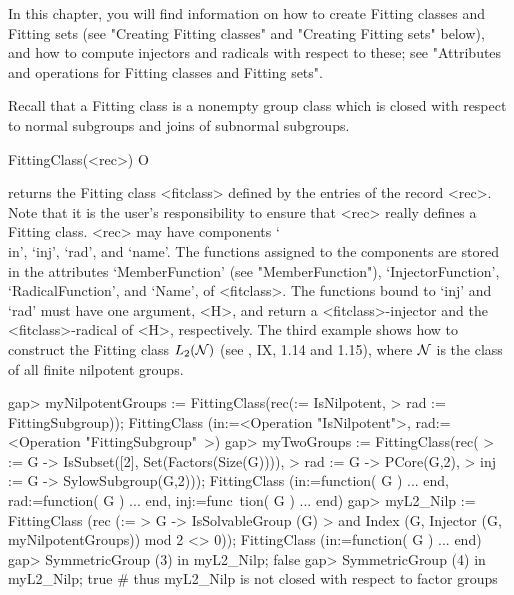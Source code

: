 
In this chapter, you will find information on how to create 
Fitting classes and Fitting sets (see "Creating Fitting classes" and
"Creating Fitting sets" below), and how to compute injectors and radicals
with respect to these;  see "Attributes and operations for Fitting classes
and Fitting sets".


\null


Recall that a Fitting class is a nonempty group class which is closed with respect
to normal subgroups and joins of subnormal subgroups.

\>FittingClass(<rec>) O

returns the Fitting class <fitclass> defined by the entries of the record
<rec>. Note that it is the user's responsibility to ensure that <rec> really
defines a Fitting class.
<rec> may have components `\\in', `inj', `rad', and `name'. The
functions assigned to the components are stored in the attributes
`MemberFunction' (see "MemberFunction"), `InjectorFunction',
`RadicalFunction', and `Name', of <fitclass>. The functions bound to `inj' and
`rad' must have one argument, <H>, and return a <fitclass>-injector and the
<fitclass>-radical of <H>, respectively. The third example shows how to construct
the Fitting class $L_2({\cal N})$ (see \cite{DH1992}, IX, 1.14 and 1.15), where
$\cal N$ is the class of all finite nilpotent groups.

\beginexample
gap> myNilpotentGroups := FittingClass(rec(\in := IsNilpotent,
>    rad := FittingSubgroup));
FittingClass (in:=<Operation "IsNilpotent">, rad:=<Operation "FittingSubgroup"\
>)
gap> myTwoGroups := FittingClass(rec(
>    \in := G -> IsSubset([2], Set(Factors(Size(G)))), 
>    rad :=  G -> PCore(G,2),
>    inj := G -> SylowSubgroup(G,2)));
FittingClass (in:=function( G ) ... end, rad:=function( G ) ... end, inj:=func\
tion( G ) ... end)
gap> myL2_Nilp := FittingClass (rec (\in := 
>     G -> IsSolvableGroup (G) 
>          and Index (G, Injector (G, myNilpotentGroups)) mod 2 <> 0));
FittingClass (in:=function( G ) ... end)
gap> SymmetricGroup (3) in myL2_Nilp;
false
gap> SymmetricGroup (4) in myL2_Nilp;
true   # thus myL2_Nilp is not closed with respect to factor groups
\endexample

